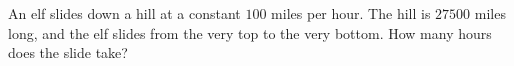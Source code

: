 An elf slides down a hill at a constant $100$ miles per hour. The hill is $27500$ miles long, and the elf slides from the very top to the very bottom. How many hours does the slide take?

